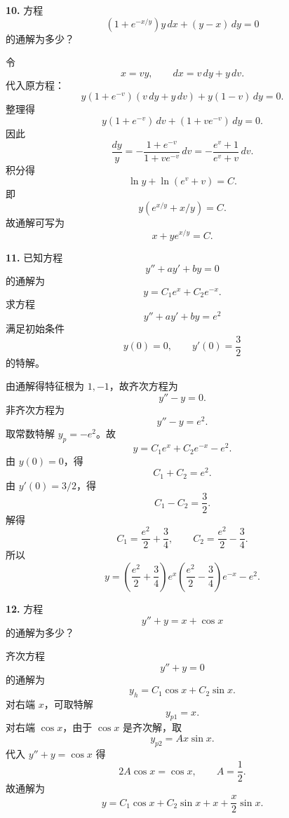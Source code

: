 \begin{problemblock}
\textbf{10.} 方程
\[
\left(1+e^{-x/y}\right)y\,dx+(y-x)\,dy=0
\]
的通解为多少？
\end{problemblock}

\begin{solutionblock}
令
\[
x=vy,\qquad dx=v\,dy+y\,dv.
\]
代入原方程：
\[
y(1+e^{-v})(v\,dy+y\,dv)+y(1-v)\,dy=0.
\]
整理得
\[
y(1+e^{-v})\,dv+(1+ve^{-v})\,dy=0.
\]
因此
\[
\frac{dy}{y}=-\frac{1+e^{-v}}{1+ve^{-v}}\,dv
=-\frac{e^v+1}{e^v+v}\,dv.
\]
积分得
\[
\ln y+\ln(e^v+v)=C.
\]
即
\[
y(e^{x/y}+x/y)=C.
\]
故通解可写为
\[
\boxed{x+ye^{x/y}=C}.
\]
\end{solutionblock}

\begin{problemblock}
\textbf{11.} 已知方程
\[
y''+ay'+by=0
\]
的通解为
\[
y=C_1e^x+C_2e^{-x}.
\]
求方程
\[
y''+ay'+by=e^2
\]
满足初始条件
\[
y(0)=0,\qquad y'(0)=\frac32
\]
的特解。
\end{problemblock}

\begin{solutionblock}
由通解得特征根为 \(1,-1\)，故齐次方程为
\[
y''-y=0.
\]
非齐次方程为
\[
y''-y=e^2.
\]
取常数特解 \(y_p=-e^2\)。故
\[
y=C_1e^x+C_2e^{-x}-e^2.
\]
由 \(y(0)=0\)，得
\[
C_1+C_2=e^2.
\]
由 \(y'(0)=3/2\)，得
\[
C_1-C_2=\frac32.
\]
解得
\[
C_1=\frac{e^2}{2}+\frac34,\qquad
C_2=\frac{e^2}{2}-\frac34.
\]
所以
\[
\boxed{
y=\left(\frac{e^2}{2}+\frac34\right)e^x
\left(\frac{e^2}{2}-\frac34\right)e^{-x}
-e^2 }.
\]
\end{solutionblock}

\begin{problemblock}
\textbf{12.} 方程
\[
y''+y=x+\cos x
\]
的通解为多少？
\end{problemblock}

\begin{solutionblock}
齐次方程
\[
y''+y=0
\]
的通解为
\[
y_h=C_1\cos x+C_2\sin x.
\]
对右端 \(x\)，可取特解
\[
y_{p1}=x.
\]
对右端 \(\cos x\)，由于 \(\cos x\) 是齐次解，取
\[
y_{p2}=Ax\sin x.
\]
代入 \(y''+y=\cos x\) 得
\[
2A\cos x=\cos x,
\qquad A=\frac12.
\]
故通解为
\[
\boxed{y=C_1\cos x+C_2\sin x+x+\frac{x}{2}\sin x}.
\]
\end{solutionblock}

